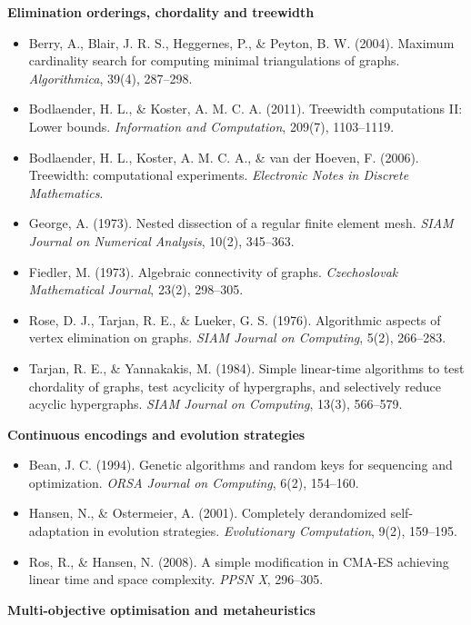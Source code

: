 \documentclass[
  11pt,
]{article}
\providecommand{\tightlist}{%
  \setlength{\itemsep}{0pt}\setlength{\parskip}{0pt}}
\begin{document}
\textbf{Elimination orderings, chordality and treewidth}

\begin{itemize}
\tightlist
\item
  Berry, A., Blair, J. R. S., Heggernes, P., \& Peyton, B. W. (2004).
  Maximum cardinality search for computing minimal triangulations of
  graphs. \emph{Algorithmica}, 39(4), 287--298.
\item
  Bodlaender, H. L., \& Koster, A. M. C. A. (2011). Treewidth
  computations II: Lower bounds. \emph{Information and Computation},
  209(7), 1103--1119.
\item
  Bodlaender, H. L., Koster, A. M. C. A., \& van der Hoeven, F. (2006).
  Treewidth: computational experiments. \emph{Electronic Notes in
  Discrete Mathematics}.
\item
  George, A. (1973). Nested dissection of a regular finite element mesh.
  \emph{SIAM Journal on Numerical Analysis}, 10(2), 345--363.
\item
  Fiedler, M. (1973). Algebraic connectivity of graphs.
  \emph{Czechoslovak Mathematical Journal}, 23(2), 298--305.
\item
  Rose, D. J., Tarjan, R. E., \& Lueker, G. S. (1976). Algorithmic
  aspects of vertex elimination on graphs. \emph{SIAM Journal on
  Computing}, 5(2), 266--283.
\item
  Tarjan, R. E., \& Yannakakis, M. (1984). Simple linear-time algorithms
  to test chordality of graphs, test acyclicity of hypergraphs, and
  selectively reduce acyclic hypergraphs. \emph{SIAM Journal on
  Computing}, 13(3), 566--579.
\end{itemize}

\textbf{Continuous encodings and evolution strategies}

\begin{itemize}
\tightlist
\item
  Bean, J. C. (1994). Genetic algorithms and random keys for sequencing
  and optimization. \emph{ORSA Journal on Computing}, 6(2), 154--160.
\item
  Hansen, N., \& Ostermeier, A. (2001). Completely derandomized
  self-adaptation in evolution strategies. \emph{Evolutionary
  Computation}, 9(2), 159--195.
\item
  Ros, R., \& Hansen, N. (2008). A simple modification in CMA-ES
  achieving linear time and space complexity. \emph{PPSN X}, 296--305.
\end{itemize}

\textbf{Multi-objective optimisation and metaheuristics}
\end{document}
